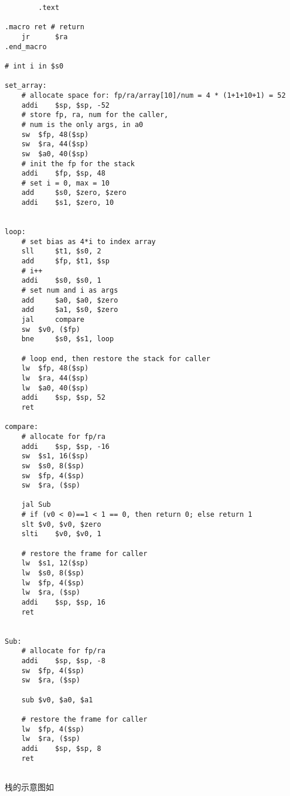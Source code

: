 \documentclass[lang=cn,11pt,a4paper,cite=authoryear]{elegantpaper}
\begin{document}


\begin{lstlisting}
		.text

.macro ret # return 
	jr   	$ra
.end_macro 

# int i in $s0

set_array:
	# allocate space for: fp/ra/array[10]/num = 4 * (1+1+10+1) = 52
	addi 	$sp, $sp, -52 
	# store fp, ra, num for the caller,
	# num is the only args, in a0
	sw	$fp, 48($sp)
	sw	$ra, 44($sp)
	sw	$a0, 40($sp)
	# init the fp for the stack
	addi	$fp, $sp, 48 
	# set i = 0, max = 10
	add 	$s0, $zero, $zero 
	addi 	$s1, $zero, 10 
	
	
loop:	
	# set bias as 4*i to index array 
	sll 	$t1, $s0, 2
	add 	$fp, $t1, $sp 
	# i++ 
	addi 	$s0, $s0, 1 
	# set num and i as args
	add 	$a0, $a0, $zero 
	add 	$a1, $s0, $zero
	jal 	compare
	sw 	$v0, ($fp) 
	bne 	$s0, $s1, loop
	
	# loop end, then restore the stack for caller
	lw	$fp, 48($sp)
	lw	$ra, 44($sp)
	lw	$a0, 40($sp)
	addi 	$sp, $sp, 52
	ret 

compare:
	# allocate for fp/ra
	addi 	$sp, $sp, -16
	sw 	$s1, 16($sp)
	sw 	$s0, 8($sp)
	sw	$fp, 4($sp)
	sw	$ra, ($sp)
	
	jal	Sub
	# if (v0 < 0)==1 < 1 == 0, then return 0; else return 1
	slt	$v0, $v0, $zero
	slti 	$v0, $v0, 1
	
	# restore the frame for caller
	lw 	$s1, 12($sp)
	lw 	$s0, 8($sp)
	lw 	$fp, 4($sp)
	lw 	$ra, ($sp)
	addi 	$sp, $sp, 16
	ret
	

Sub: 
	# allocate for fp/ra
	addi 	$sp, $sp, -8
	sw	$fp, 4($sp)
	sw	$ra, ($sp)
	
	sub	$v0, $a0, $a1
	
	# restore the frame for caller
	lw 	$fp, 4($sp)
	lw 	$ra, ($sp)
	addi 	$sp, $sp, 8
	ret
	
\end{lstlisting}

栈的示意图如 


\end{document}
